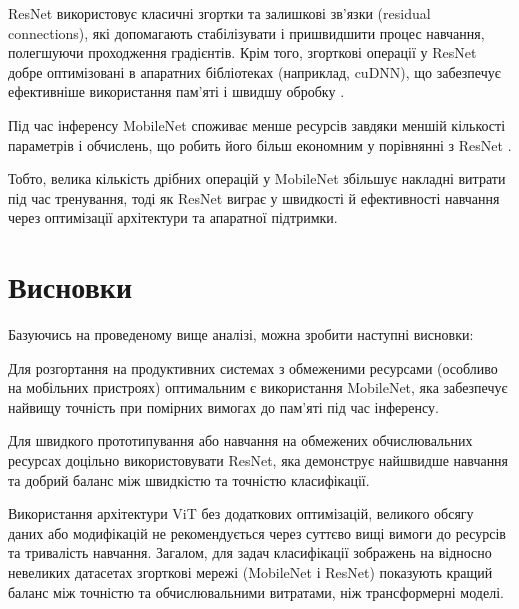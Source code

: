 \documentclass[14pt,a4paper]{extarticle}
\begin{document}
ResNet використовує класичні згортки та залишкові зв’язки (residual connections), які допомагають стабілізувати і пришвидшити процес навчання, полегшуючи проходження градієнтів. Крім того, згорткові операції у ResNet добре оптимізовані в апаратних бібліотеках (наприклад, cuDNN), що забезпечує ефективніше використання пам’яті і швидшу обробку \cite{he2016deep, szegedy2017inception}.

Під час інференсу MobileNet споживає менше ресурсів завдяки меншій кількості параметрів і обчислень, що робить його більш економним у порівнянні з ResNet \cite{howard2017mobilenets, sandler2018mobilenetv2}. 

Тобто, велика кількість дрібних операцій у MobileNet збільшує накладні витрати під час тренування, тоді як ResNet виграє у швидкості й ефективності навчання через оптимізації архітектури та апаратної підтримки.



\section{Висновки}
\label{sec:conclusions}
Базуючись на проведеному вище аналізі, можна зробити наступні висновки:

Для розгортання на продуктивних системах з обмеженими ресурсами (особливо на мобільних пристроях) оптимальним є використання MobileNet, яка забезпечує найвищу точність при помірних вимогах до пам'яті під час інференсу.

Для швидкого прототипування або навчання на обмежених обчислювальних ресурсах доцільно використовувати ResNet, яка демонструє найшвидше навчання та добрий баланс між швидкістю та точністю класифікації.

Використання архітектури ViT без додаткових оптимізацій, великого обсягу даних або модифікацій не рекомендується через суттєво вищі вимоги до ресурсів та тривалість навчання. Загалом, для задач класифікації зображень на відносно невеликих датасетах згорткові мережі (MobileNet і ResNet) показують кращий баланс між точністю та обчислювальними витратами, ніж трансформерні моделі.



\newpage
\printbibliography[heading=bibintoc,title={Список використаних джерел}]
\end{document}
